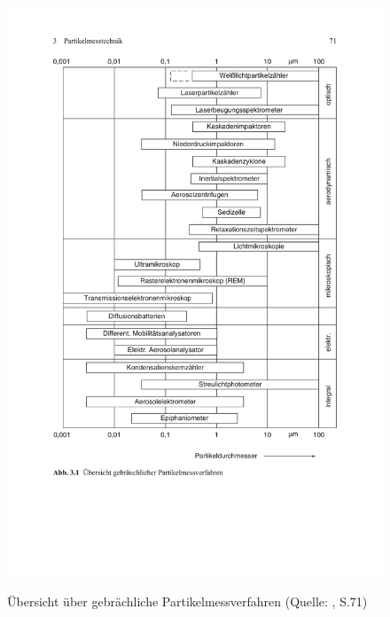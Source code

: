 \begin{figure}[H]
	\myfloatalign
	{\includegraphics[width=.9\linewidth]{gfx/requirements/partikelmessverfahren.pdf}} \quad
	\caption[\"{U}bersicht \"{u}ber gebr\"{a}chliche Partikelmessverfahren (Quelle: \cite{reinraum}, S.71)]
	{\"{U}bersicht \"{u}ber gebr\"{a}chliche Partikelmessverfahren (Quelle: \cite{reinraum}, S.71)}
	\label{fig:verfahren}
\end{figure}

